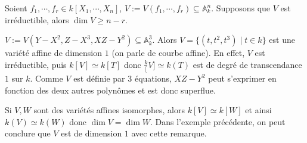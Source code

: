             \begin{remq}
                \label{rq113}
                Soient $f_1, \cdots, f_r \in k[X_1, \cdots, X_n]$, $V := V(f_1, \cdots, f_r) \subseteq \mathbb{A}^n_k$. Supposons que $V$ est irréductible, alors $\dim V \geq n-r$. 
            \end{remq}
            \begin{expl}
                $V := V(Y - X^2, Z - X^3, XZ - Y^2) \subseteq \mathbb{A}^3_k$. Alors $V = \{(t,t^2, t^3) \mid t \in k\}$ est une variété affine de dimension $1$ (on parle de courbe affine). En effet, $V$ est irréductible, puis $k[V] \simeq k[T]$ donc $\frac k[V] \simeq k(T)$ est de degré de transcendance $1$ sur $k$. Comme $V$ est définie par $3$ équations, $XZ - Y^2$ peut s'exprimer en fonction des deux autres polynômes et est donc superflue.
            \end{expl}
            \begin{remq}
                Si $V,W$ sont des variétés affines isomorphes, alors $k[V] \simeq k[W]$ et ainsi $k(V) \simeq k(W)$ donc $\dim V = \dim W$. Dans l'exemple précédente, on peut conclure que $V$ est de dimension $1$ avec cette remarque.
            \end{remq}
